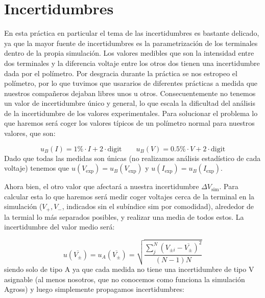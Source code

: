\documentclass[11pt]{article}
\newcommand{\simu}{\text{sim}}
\begin{document}



\section{Incertidumbres}

En esta práctica en particular el tema de las incertidumbres es bastante delicado, ya que la mayor fuente de incertidumbres es la parametrización de los terminales dentro de la propia simulación. Los valores medibles que son la intensidad entre dos terminales y la diferencia voltaje entre los otros dos tienen una incertidumbre dada por el polímetro. Por desgracia durante la práctica se nos estropeo el polímetro, por lo que tuvimos que usararios de diferentes prácticas a medida que nuestros compañeros dejaban libres unos u otros. Consecuentemente no tenemos un valor de incertidumbre único y general, lo que escala la dificultad del análisis de la incertidumbre de los valores experimentales. Para solucionar el problema lo que haremos será coger los valores típicos de un polímetro normal para nuestros valores, que son:

\begin{equation}
	u_B(I) = 1\% \cdot I + 2 \cdot \text{digit} \qquad 	u_B(V) = 0.5\% \cdot V + 2 \cdot \text{digit} 
\end{equation}
Dado que todas las medidas son únicas (no realizamos análisis estadístico de cada voltaje) tenemos que $u(V_{\exp})=u_B(V_{\exp})$ y $u(I_{\exp})=u_B(I_{\exp})$.

Ahora bien, el otro valor que afectará a nuestra incertidumbre $\Delta V_{\simu}$. Para calcular esta lo que haremos será medir coger voltajes cerca de la terminal en la simulación ($V_+,V_-$, indicados sin el subíndice sim por comodidad), alrededor de la termial lo más separados posibles, y realizar una media de todos estos. La incertidumbre  del valor medio será: 

\begin{equation}
	u(\overline{V_\pm}) = u_A(\overline{V_\pm}) = \sqrt{\frac{\sum_j^N (V_{\pm i} - \overline{ V_\pm})^2}{(N-1)N}}
\end{equation}
siendo solo de tipo A ya que cada medida no tiene una incertidumbre de tipo V asignable (al menos nosotros, que no conocemos como funciona la simulación Agross) y luego simplemente propagamos incertidumbres:
\end{document}
